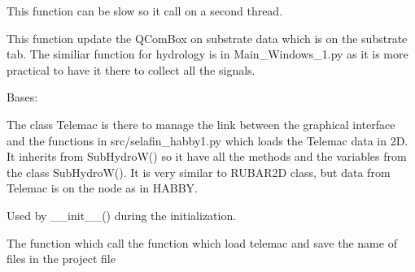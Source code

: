 \documentclass[letterpaper,10pt,english]{sphinxmanual}
\begin{document}
\begin{fulllineitems}
\begin{fulllineitems}
This function can be slow so it call on a second thread.

\end{fulllineitems}


\begin{fulllineitems}
\label{\detokenize{index:src_GUI.hydro_GUI_2.SubstrateW.update_sub_hdf5_name}}
This function update the QComBox on substrate data which is on the substrate tab. The similiar function
for hydrology is in Main\_Windows\_1.py as it is more practical to have it there to collect all the signals.

\end{fulllineitems}


\end{fulllineitems}


\begin{fulllineitems}
\label{\detokenize{index:src_GUI.hydro_GUI_2.TELEMAC}}
Bases: {\hyperref[\detokenize{index:src_GUI.hydro_GUI_2.SubHydroW}]{}}

The class Telemac is there to manage the link between the graphical interface and the functions in src/selafin\_habby1.py
which loads the Telemac data in 2D. It inherits from SubHydroW() so it have all the methods and the variables
from the class SubHydroW(). It is very similar to RUBAR2D class, but data from Telemac is on the node as in HABBY.

\begin{fulllineitems}
\label{\detokenize{index:src_GUI.hydro_GUI_2.TELEMAC.init_iu}}
Used by \_\_init\_\_() during the initialization.

\end{fulllineitems}


\begin{fulllineitems}
\label{\detokenize{index:src_GUI.hydro_GUI_2.TELEMAC.load_telemac_gui}}
The function which call the function which load telemac and save the name of files in the project file

\end{fulllineitems}


\end{fulllineitems}
\end{document}
